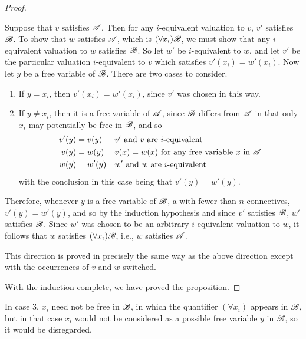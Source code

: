 \begin{proposition}
\begin{proof}
\begin{enumerate}
        \Ra{} Suppose that \(v\) satisfies \(\mathscr{A}\). Then for any \(i\)-equivalent valuation to \(v\), \(v'\) satisfies \(\mathscr{B}\). To show that \(w\) satisfies \(\mathscr{A}\), which is \((\forall x_i) \mathscr{B}\), we must show that any \(i\)-equivalent valuation to \(w\) satisfies \(\mathscr{B}\). So let \(w'\) be \(i\)-equivalent to \(w\), and let \(v'\) be the particular valuation \(i\)-equivalent to \(v\) which satisfies \(v'(x_i) = w'(x_i)\). Now let \(y\) be a free variable of \(\mathscr{B}\). There are two cases to consider.
        \begin{enumerate}
          \item If \(y = x_i\), then \(v'(x_i) = w'(x_i)\), since \(v'\) was chosen in this way. 
          \item If \(y \neq x_i\), then it is a free variable of \(\mathscr{A}\), since \(\mathscr{B}\) differs from \(\mathscr{A}\) in that only \(x_i\) may potentially be free in \(\mathscr{B}\), and so
            \begin{align*}
              v'(y) &= v(y)       &&\text{\(v'\) and \(v\) are \(i\)-equivalent}\\
              v(y)  &= w(y)       &&\text{\(v(x) = w(x)\) for any free variable \(x\) in \(\ensuremath\mathscr{A}\)}\\
              w(y)  &= w'(y)      &&\text{\(w'\) and \(w\) are \(i\)-equivalent}
            \end{align*}
          with the conclusion in this case being that \(v'(y) = w'(y)\).
        \end{enumerate}
        Therefore, whenever \(y\) is a free variable of \(\mathscr{B}\), a \wf{} with fewer than \(n\) connectives, \(v'(y) = w'(y)\), and so by the induction hypothesis and since \(v'\) satisfies \(\mathscr{B}\), \(w'\) satisfies \(\mathscr{B}\). Since \(w'\) was chosen to be an arbitrary \(i\)-equivalent valuation to \(w\), it follows that \(w\) satisfies \((\forall x_i) \mathscr{B}\), i.e., \(w\) satisfies \(\mathscr{A}\).

        \La{} This direction is proved in precisely the same way as the above direction except with the occurrences of \(v\) and \(w\) switched.
    \end{enumerate}

    With the induction complete, we have proved the proposition.
  \end{proof}

  \note{} In case 3, \(x_i\) need not be free in \(\mathscr{B}\), in which the quantifier \((\forall x_i)\) appears in \(\mathscr{B}\), but in that case \(x_i\) would not be considered as a possible free variable \(y\) in \(\mathscr{B}\), so it would be disregarded.


\end{proposition}
